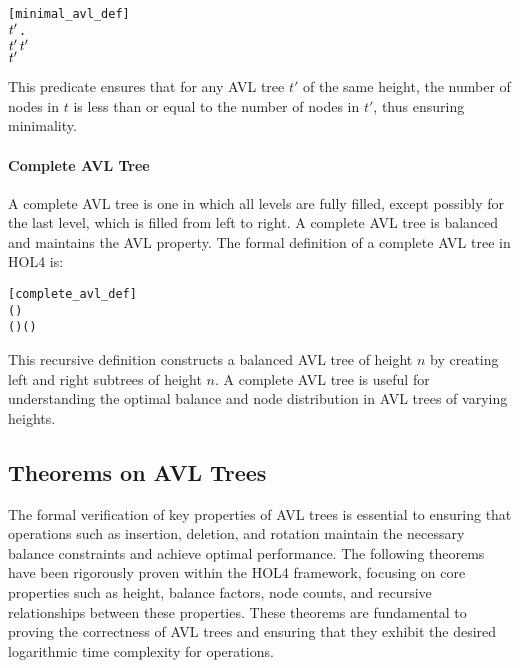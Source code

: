 \documentclass[12pt]{article}
\begin{document}
\begin{alltt}
[minimal_avl_def]
  \HOLTokenDefEquality{}
    \HOLSymConst{\HOLTokenConj{}}
  \HOLSymConst{\HOLTokenForall{}}\ensuremath{\HOLBoundVar{t}\sp{\prime{}}}.
     \ensuremath{\HOLBoundVar{t}\sp{\prime{}}} \HOLSymConst{\HOLTokenConj{}}  \ensuremath{\HOLBoundVar{t}\sp{\prime{}}} \HOLSymConst{=}   \HOLSymConst{\HOLTokenImp{}}
      \HOLSymConst{\HOLTokenLeq{}}  \ensuremath{\HOLBoundVar{t}\sp{\prime{}}}
\end{alltt}

This predicate ensures that for any AVL tree \( t' \) of the same height, the number of nodes in \( t \) is less than or equal to the number of nodes in \( t' \), thus ensuring minimality.

\paragraph{Complete AVL Tree}
A complete AVL tree is one in which all levels are fully filled, except possibly for the last level, which is filled from left to right. A complete AVL tree is balanced and maintains the AVL property. The formal definition of a complete AVL tree in HOL4 is:

\begin{alltt}
[complete_avl_def]
  \HOLTokenDefEquality{} 
 ( ) \HOLTokenDefEquality{}
      ( ) ( )
\end{alltt}

This recursive definition constructs a balanced AVL tree of height \( n \) by creating left and right subtrees of height \( n \). A complete AVL tree is useful for understanding the optimal balance and node distribution in AVL trees of varying heights.


\subsection{Theorems on AVL Trees}
The formal verification of key properties of AVL trees is essential to ensuring that operations such as insertion, deletion, and rotation maintain the necessary balance constraints and achieve optimal performance. The following theorems have been rigorously proven within the HOL4 framework, focusing on core properties such as height, balance factors, node counts, and recursive relationships between these properties. These theorems are fundamental to proving the correctness of AVL trees and ensuring that they exhibit the desired logarithmic time complexity for operations.
\end{document}

